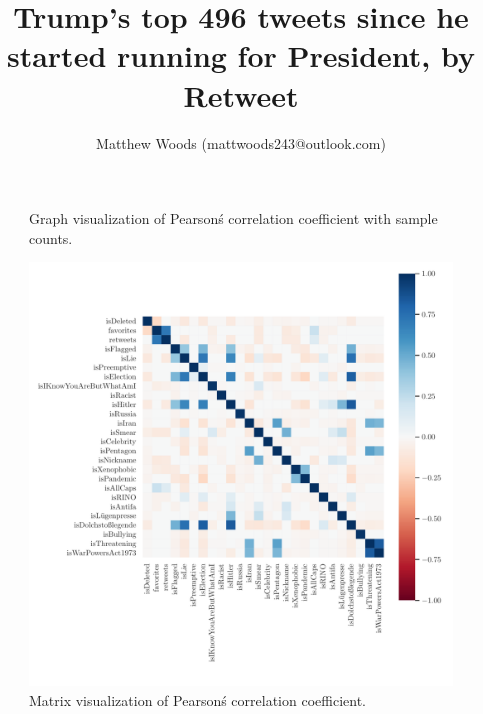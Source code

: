 \documentclass{article}
\begin{document}
    \title{Trump's top 496 tweets since he started running for President, by Retweet}
    \author{Matthew Woods (mattwoods243@outlook.com)}
    \maketitle
    \begin{figure}
         \hspace{-1.5cm}
         
         \caption{Graph visualization of Pearson\'s correlation coefficient with sample counts.}
    \end{figure}
 
    \begin{figure}
         \vspace{-4cm}
         \hspace{-3cm}
         \includegraphics[scale=.8]{corr_heatmap.pdf}
         \caption{Matrix visualization of Pearson\'s correlation coefficient.}
    \end{figure}
    
\end{document}
